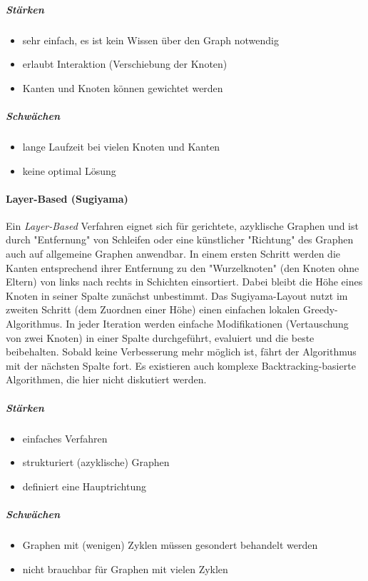 					\subparagraph{Stärken}
					\begin{itemize}
						\item sehr einfach, es ist kein Wissen über den Graph notwendig
						\item erlaubt Interaktion (\zB Verschiebung der Knoten)
						\item Kanten und Knoten können gewichtet werden
					\end{itemize}

					\subparagraph{Schwächen}
					\begin{itemize}
						\item lange Laufzeit bei vielen Knoten und Kanten
						\item keine optimal Lösung
					\end{itemize}

				\paragraph{Layer-Based (Sugiyama)}
					Ein \emph{Layer-Based} Verfahren eignet sich für gerichtete, azyklische Graphen und ist durch "Entfernung" von Schleifen oder eine künstlicher "Richtung" des Graphen auch auf allgemeine Graphen anwendbar. In einem ersten Schritt werden die Kanten entsprechend ihrer Entfernung zu den "Wurzelknoten" (den Knoten ohne Eltern) von links nach rechts in Schichten einsortiert. Dabei bleibt die Höhe eines Knoten in seiner Spalte zunächst unbestimmt. Das Sugiyama-Layout nutzt im zweiten Schritt (dem Zuordnen einer Höhe) einen einfachen lokalen Greedy-Algorithmus. In jeder Iteration werden einfache Modifikationen (\zB Vertauschung von zwei Knoten) in einer Spalte durchgeführt, evaluiert und die beste beibehalten. Sobald keine Verbesserung mehr möglich ist, fährt der Algorithmus mit der nächsten Spalte fort. Es existieren auch komplexe Backtracking-basierte Algorithmen, die hier nicht diskutiert werden.

					\subparagraph{Stärken}
					\begin{itemize}
						\item einfaches Verfahren
						\item strukturiert (azyklische) Graphen
						\item definiert eine Hauptrichtung
					\end{itemize}

					\subparagraph{Schwächen}
					\begin{itemize}
						\item Graphen mit (wenigen) Zyklen müssen gesondert behandelt werden
						\item nicht brauchbar für Graphen mit vielen Zyklen
					\end{itemize}

